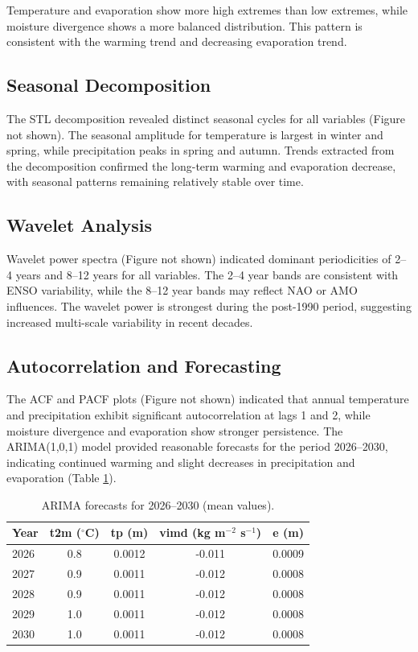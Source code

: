 \documentclass[12pt,a4paper]{article}
\begin{document}
Temperature and evaporation show more high extremes than low extremes, while moisture divergence shows a more balanced distribution. This pattern is consistent with the warming trend and decreasing evaporation trend.

\subsection{Seasonal Decomposition}

The STL decomposition revealed distinct seasonal cycles for all variables (Figure not shown). The seasonal amplitude for temperature is largest in winter and spring, while precipitation peaks in spring and autumn. Trends extracted from the decomposition confirmed the long-term warming and evaporation decrease, with seasonal patterns remaining relatively stable over time.

\subsection{Wavelet Analysis}

Wavelet power spectra (Figure not shown) indicated dominant periodicities of 2–4 years and 8–12 years for all variables. The 2–4 year bands are consistent with ENSO variability, while the 8–12 year bands may reflect NAO or AMO influences. The wavelet power is strongest during the post-1990 period, suggesting increased multi-scale variability in recent decades.

\subsection{Autocorrelation and Forecasting}

The ACF and PACF plots (Figure not shown) indicated that annual temperature and precipitation exhibit significant autocorrelation at lags 1 and 2, while moisture divergence and evaporation show stronger persistence. The ARIMA(1,0,1) model provided reasonable forecasts for the period 2026–2030, indicating continued warming and slight decreases in precipitation and evaporation (Table \ref{tab:arima}).

\begin{table}[H]
\centering
\caption{ARIMA forecasts for 2026–2030 (mean values).}
\label{tab:arima}
\begin{tabular}{l c c c c}
\toprule
\textbf{Year} & \textbf{t2m ($^\circ$C)} & \textbf{tp (m)} & \textbf{vimd (kg m$^{-2}$ s$^{-1}$)} & \textbf{e (m)} \\
\midrule
2026 & 0.8 & 0.0012 & -0.011 & 0.0009 \\
2027 & 0.9 & 0.0011 & -0.012 & 0.0008 \\
2028 & 0.9 & 0.0011 & -0.012 & 0.0008 \\
2029 & 1.0 & 0.0011 & -0.012 & 0.0008 \\
2030 & 1.0 & 0.0011 & -0.012 & 0.0008 \\
\bottomrule
\end{tabular}
\end{table}
\end{document}
